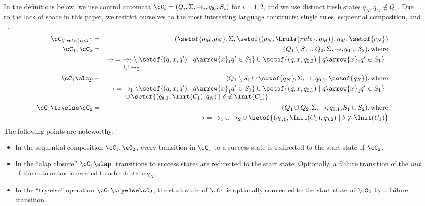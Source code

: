 In the definitions below, we use control automata $\cC_i = (Q_i, \Sigma,
\rightarrow_i, q_{0_i}, S_i)$ for $i=1,2$, and we use distinct fresh states
$q_N,q_M\notin Q_1$.  Due to the lack of space in this paper, we restrict
ourselves to the most interesting language constructs: single rules, sequential
composition, \alapK{} and \tryK--\elseK.
%
\begin{eqnarray*}
\cC_{\Lrule{rule}} & =
   & ( \setof{q_M,q_N}, \Sigma, \setof{(q_N,\Lrule{rule},q_M)}, q_M, \setof{q_N}) \\
\cC_1;\cC_2 & =
   & (Q_{1} \setminus S_1 \cup Q_{2}, \Sigma, \rightarrow, q_{0,1}, S_2), \text{where} \\
  && {\rightarrow} =
         \begin{array}[t]{@{}l}
             {\rightarrow_{1}} \setminus \setof{(q,x,q') \mid q \arrow{x}_1 q' \in S_1}
               \cup \setof{ (q,x,q_{0,2}) \mid q \arrow{x}_1 q' \in S_1 } \\
             {} \cup {\rightarrow_{2}}
         \end{array} \\
\cC_1 \alap & =
   & (Q_1 \setminus S_1 \cup \setof{q_N}, \Sigma, \rightarrow, q_{0,1}, \setof{q_N}),
      \text{where} \\
  && {\rightarrow} =
         \begin{array}[t]{@{}l}
             \rightarrow_1 \setminus \setof{ (q,x,q') \mid q \arrow{x}_1 q' \in S_1}
	        \cup \setof{ (q,x,q_{0,1}) \mid q \arrow{x}_1 q' \in S_1 } \\
             {} \cup \setof{(q_{0,1},\Init(C_1),q_N) \mid \delta \not\in \Init(C_1)}
         \end{array} \\
\cC_1 \tryelse \cC_2 & =
   & (Q_1 \cup Q_2, \Sigma, \rightarrow, q_{0,1}, S_1 \cup S_2), \text{where} \\
  && {\rightarrow} = {\rightarrow_{1}} \cup {\rightarrow_{2}}
          \cup \setof{(q_{0,1},\Init(C_1),q_{0,2}) \mid \delta \not\in \Init(C_1) }
\end{eqnarray*}
%
The following points are noteworthy:
\begin{itemize}
\item In the sequential composition $\cC_1;\cC_2$, every transition in $\cC_1$
  to a success state is redirected to the start state of $\cC_2$.
\item In the ``alap closure'' $\cC_1\alap$, transitions to success states are
  redirected to the start state. Optionally, a failure transition of the \emph{init} of the automaton is created to a fresh state $q_N$.
\item In the ``try-else'' operation $\cC_1\tryelse \cC_2$, the start state of
  $\cC_1$ is optionally connected to the start state of $\cC_2$ by a failure
  transition.
\end{itemize}
